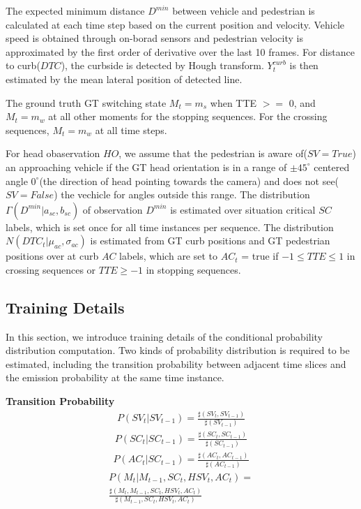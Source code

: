 \documentclass[10pt,twocolumn,letterpaper]{article}
\begin{document}
    The expected minimum distance $D^{min}$ between vehicle and pedestrian is calculated 
    at each time step based on the current position and velocity. Vehicle speed is obtained
    through on-borad sensors and pedestrian velocity is approximated by the first order
    of derivative over the last 10 frames. For distance to curb($DTC$), the curbside is detected
    by Hough transform. $Y_t^{curb}$ is then estimated by the mean lateral position of detected 
    line. 
    

    The ground truth GT switching state $M_t = m_s$ when TTE $>=$ 0, and $M_t = m_w$ at all
    other moments for the stopping sequences. For the crossing sequences, $M_t = m_w$ 
    at all time steps. 

    For head obaservation $HO$, we assume that the pedestrian is aware of($SV = True$) an approaching vehicle
    if the GT head orientation is in a range of $\pm 45^{\circ}$ centered angle $0^{\circ}$(the 
    direction of head pointing towards the camera) and does not see($SV = False$) the vechicle for angles outside
    this range. 
    The distribution $\Gamma(D^{min}|a_{sc}, b_{sc})$ of observation $D^{min}$ is estimated 
    over situation critical $SC$ labels, which is set once for all time instances
    per sequence. The distribution $N(DTC_t|\mu_{ac},\sigma_{ac})$
    is estimated from GT curb positions and GT pedestrian positions over at curb $AC$ labels, 
    which are set to $AC_t$ = true if $-1\leq TTE \leq 1$ in crossing sequences or $TTE \geq -1$
    in stopping sequences.

    
    \subsection{Training Details}
    In this section, we introduce training details of the conditional probability distribution  
    computation.
    Two kinds of probability distribution is required to be estimated, including the 
    transition probability between adjacent time slices and the emission probability
    at the same time instance. 
    
    \noindent
    \textbf{Transition Probability} 
    \begin{eqnarray*}
        P(SV_t|SV_{t-1}) = \frac{\sharp(SV_t, SV_{t-1})}{\sharp(SV_{t-1})}
    \end{eqnarray*}
    \begin{eqnarray*}
        P(SC_t|SC_{t-1}) = \frac{\sharp(SC_t, SC_{t-1})}{\sharp(SC_{t-1})}
    \end{eqnarray*}
    \begin{eqnarray*}
        P(AC_t|SC_{t-1}) = \frac{\sharp(AC_t, AC_{t-1})}{\sharp(AC_{t-1})}
    \end{eqnarray*}
    \begin{eqnarray*}
        P(M_t|M_{t-1}, SC_t, HSV_t, AC_t) = \\
         \frac{\sharp(M_t,M_{t-1}, SC_t, HSV_t, AC_t)}{\sharp(M_{t-1}, SC_t, HSV_t, AC_t)}
    \end{eqnarray*}
\end{document}
